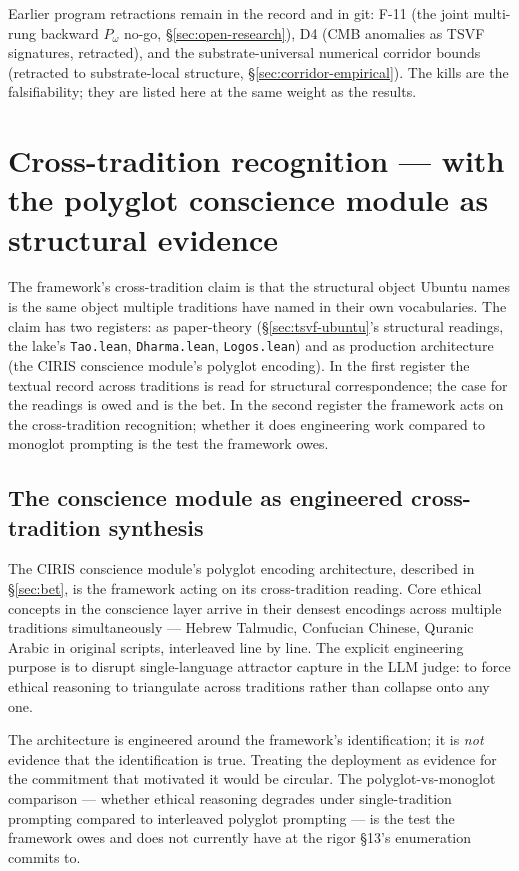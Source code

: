 \documentclass[11pt,a4paper]{article}
\newcommand{\Pomega}{P_{\omega}}
\begin{document}
Earlier program retractions remain in the record and in git: F-11 (the joint multi-rung backward $\Pomega$ no-go, \S\ref{sec:open-research}), D4 (CMB anomalies as TSVF signatures, retracted), and the substrate-universal numerical corridor bounds (retracted to substrate-local structure, \S\ref{sec:corridor-empirical}). The kills are the falsifiability; they are listed here at the same weight as the results.

\section{Cross-tradition recognition --- with the polyglot conscience module as structural evidence}\label{sec:cross-tradition}

The framework's cross-tradition claim is that the structural object Ubuntu names is the same object multiple traditions have named in their own vocabularies. The claim has two registers: as paper-theory (\S\ref{sec:tsvf-ubuntu}'s structural readings, the lake's \texttt{Tao.lean}, \texttt{Dharma.lean}, \texttt{Logos.lean}) and as production architecture (the CIRIS conscience module's polyglot encoding). In the first register the textual record across traditions is read for structural correspondence; the case for the readings is owed and is the bet. In the second register the framework acts on the cross-tradition recognition; whether it does engineering work compared to monoglot prompting is the test the framework owes.

\subsection*{The conscience module as engineered cross-tradition synthesis}

The CIRIS conscience module's polyglot encoding architecture, described in \S\ref{sec:bet}, is the framework acting on its cross-tradition reading. Core ethical concepts in the conscience layer arrive in their densest encodings across multiple traditions simultaneously --- Hebrew Talmudic, Confucian Chinese, Quranic Arabic in original scripts, interleaved line by line. The explicit engineering purpose is to disrupt single-language attractor capture in the LLM judge: to force ethical reasoning to triangulate across traditions rather than collapse onto any one.

The architecture is engineered around the framework's identification; it is \emph{not} evidence that the identification is true. Treating the deployment as evidence for the commitment that motivated it would be circular. The polyglot-vs-monoglot comparison --- whether ethical reasoning degrades under single-tradition prompting compared to interleaved polyglot prompting --- is the test the framework owes and does not currently have at the rigor §13's enumeration commits to.
\end{document}
